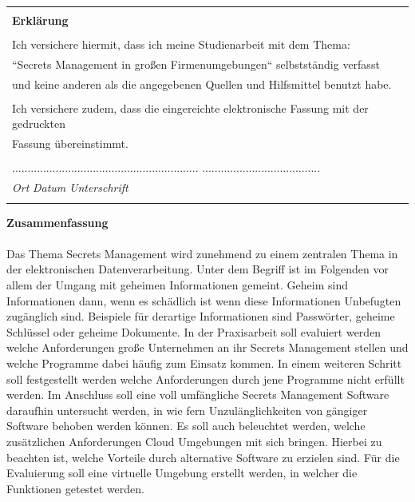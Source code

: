 \documentclass[
book,
a4paper,   
titlepage,  
halfparskip,
12pt        
]{scrartcl}
\begin{document}
\thispagestyle{empty}

\begin{table}[h]
\centering
  \begin{tabular}{| l |}
  \hline
  \\
  \textbf{Erklärung} \\
  \\
  Ich versichere hiermit, dass ich meine Studienarbeit mit dem Thema: \\
  ``Secrets Management in großen Firmenumgebungen`` selbstständig verfasst \\
  und keine anderen als die angegebenen Quellen und Hilfsmittel benutzt habe. \\
  \\
  Ich versichere zudem, dass die eingereichte elektronische Fassung mit der gedruckten \\
  Fassung übereinstimmt. \\ \\
  ............................................................\hspace{0.5cm} ......................................\\
  \textit{Ort} \hspace{1cm} \textit{Datum} \hspace{4.2cm} \textit{Unterschrift}\\
  \\
  \hline
  \end{tabular}
\end{table}
\newpage

\thispagestyle{empty}

\large{\textbf{Zusammenfassung}}\\
\\
Das Thema Secrets Management wird zunehmend zu einem zentralen Thema in der
elektronischen Datenverarbeitung.  Unter dem Begriff ist im Folgenden vor
allem der Umgang mit geheimen Informationen gemeint.  Geheim sind
Informationen dann, wenn es schädlich ist wenn diese Informationen
Unbefugten zugänglich sind. Beispiele für derartige Informationen sind
Passwörter, geheime Schlüssel oder geheime Dokumente.  In der
Praxisarbeit soll evaluiert werden welche Anforderungen große Unternehmen
an ihr Secrets Management stellen und welche Programme dabei häufig zum
Einsatz kommen.  In einem weiteren Schritt soll festgestellt werden welche
Anforderungen durch jene Programme nicht erfüllt werden.  Im Anschluss
soll eine voll umfängliche Secrets Management Software daraufhin untersucht
werden, in wie fern Unzulänglichkeiten von gängiger Software behoben
werden können.  Es soll auch beleuchtet werden, welche zusätzlichen
Anforderungen Cloud Umgebungen mit sich bringen.  Hierbei zu beachten ist,
welche Vorteile durch alternative Software zu erzielen sind.  Für die
Evaluierung soll eine virtuelle Umgebung erstellt werden, in welcher die
Funktionen getestet werden.
\newpage
\thispagestyle{empty}
\end{document}
